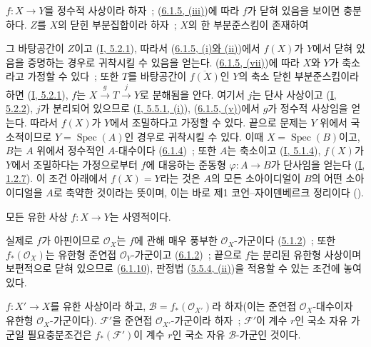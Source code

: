 $f:X\to Y$를 정수적 사상이라 하자~; 
(\hyperref[II.6.1.5-ko]{6.1.5, (iii)})에 따라 $f$가 닫혀 있음을 보이면
충분하다. $Z$를 $X$의 닫힌 부분집합이라 하자~; $X$의 한 부분준스킴이
존재하여


그 바탕공간이 $Z$이고 (\hyperref[I.5.2.1-ko]{I, 5.2.1}), 따라서
(\hyperref[II.6.1.5-ko]{6.1.5, (i)와 (ii)})에서 $f(X)$가 $Y$에서
닫혀 있음을 증명하는 경우로 귀착시킬 수 있음을 얻는다.
(\hyperref[II.6.1.5-ko]{6.1.5, (vii)})에 따라 $X$와 $Y$가 축소라고
가정할 수 있다~; 또한 $T$를 바탕공간이 $\overline{f(X)}$인 $Y$의 축소
닫힌 부분준스킴이라 하면 (\hyperref[I.5.2.1-ko]{I, 5.2.1}), $f$는
$X\xrightarrow{g}T\xrightarrow{j}Y$로 분해됨을 안다. 여기서 $j$는 단사
사상이고 (\hyperref[I.5.2.2-ko]{I, 5.2.2}), $j$가 분리되어 있으므로
(\hyperref[I.5.5.1-ko]{I, 5.5.1, (i)}),
(\hyperref[II.6.1.5-ko]{6.1.5, (v)})에서 $g$가 정수적 사상임을 얻는다.
따라서 $f(X)$가 $Y$에서 조밀하다고 가정할 수 있다. 끝으로 문제는
$Y$ 위에서 국소적이므로 $Y=\operatorname{Spec}(A)$인 경우로 귀착시킬
수 있다. 이때 $X=\operatorname{Spec}(B)$이고, $B$는 $A$ 위에서
정수적인 $A$-대수이다 (\hyperref[II.6.1.4-ko]{6.1.4})~; 또한 $A$는
축소이고 (\hyperref[I.5.1.4-ko]{I, 5.1.4}), $f(X)$가 $Y$에서
조밀하다는 가정으로부터 $f$에 대응하는 준동형 $\varphi:A\to B$가
단사임을 얻는다 (\hyperref[I.1.2.7-ko]{I, 1.2.7}). 이 조건 아래에서
$f(X)=Y$라는 것은 $A$의 모든 소아이디얼이 $B$의 어떤 소아이디얼을
$A$로 축약한 것이라는 뜻이며, 이는 바로 제1 코언--자이덴베르크 정리이다
(\cite[t.~I, p.~257, th.~3]{I-13}).

\begin{corollary}[6.1.11]
\label{II.6.1.11-ko}
모든 유한 사상 $f:X\to Y$는 사영적이다.
\end{corollary}

실제로 $f$가 아핀이므로 $\mathcal{O}_X$는 $f$에 관해 매우 풍부한
$\mathcal{O}_X$-가군이다 (\hyperref[II.5.1.2-ko]{5.1.2})~; 또한
$f_*(\mathcal{O}_X)$는 유한형 준연접 $\mathcal{O}_Y$-가군이고
(\hyperref[II.6.1.2-ko]{6.1.2})~; 끝으로 $f$는 분리된 유한형 사상이며
보편적으로 닫혀 있으므로 (\hyperref[II.6.1.10-ko]{6.1.10}), 판정법
(\hyperref[II.5.5.4-ko]{5.5.4, (ii)})을 적용할 수 있는 조건에 놓여 있다.

\begin{proposition}[6.1.12]
\label{II.6.1.12-ko}
$f:X'\to X$를 유한 사상이라 하고,
$\mathcal{B}=f_*(\mathcal{O}_{X'})$라 하자(이는 준연접
$\mathcal{O}_X$-대수이자 유한형 $\mathcal{O}_X$-가군이다).
$\mathcal{F}'$을 준연접 $\mathcal{O}_{X'}$-가군이라 하자~;
$\mathcal{F}'$이 계수 $r$인 국소 자유 가군일 필요충분조건은
$f_*(\mathcal{F}')$이 계수 $r$인 국소 자유 $\mathcal{B}$-가군인 것이다.
\end{proposition}

